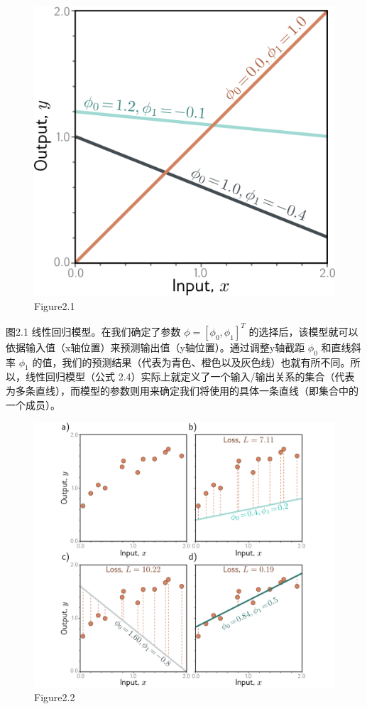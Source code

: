 \documentclass[
]{article}
\begin{document}
\begin{figure}
\centering
\includegraphics{figures/chapter2/SupervisedLinear.svg}
\caption{Figure2.1}
\end{figure}

图2.1 线性回归模型。在我们确定了参数 \(\phi = [\phi_0 , \phi_1 ]^T\)
的选择后，该模型就可以依据输入值（x轴位置）来预测输出值（y轴位置）。通过调整y轴截距
\(\phi_0\) 和直线斜率 \(\phi_1\)
的值，我们的预测结果（代表为青色、橙色以及灰色线）也就有所不同。所以，线性回归模型（公式
2.4）实际上就定义了一个输入/输出关系的集合（代表为多条直线），而模型的参数则用来确定我们将使用的具体一条直线（即集合中的一个成员）。

\begin{figure}
\centering
\includegraphics{figures/chapter2/SupervisedLinearFitError.svg}
\caption{Figure2.2}
\end{figure}
\end{document}
